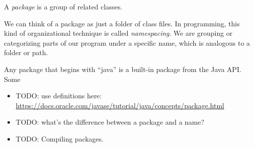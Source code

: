 \begin{definition}
A \emph{package} is a group of related classes.
\end{definition}

We can think of a package as just a folder of class files. In programming, this kind of organizational technique is called \emph{namespacing}. We are grouping or categorizing parts of our program under a specific name, which is analogous to a folder or path.

Any package that begins with ``java'' is a built-in package from the Java API. Some

\begin{itemize}
    \item TODO: use definitions here: \url{https://docs.oracle.com/javase/tutorial/java/concepts/package.html}
    
    \item TODO: what's the difference between a package and a name?
    
    \item TODO: Compiling packages.
\end{itemize}